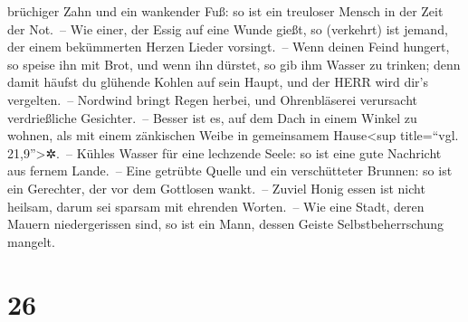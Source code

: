 brüchiger Zahn und ein wankender Fuß: so ist ein treuloser Mensch in der
Zeit der Not.~-- Wie einer, der Essig auf eine Wunde
gießt, so (verkehrt) ist jemand, der einem bekümmerten Herzen Lieder
vorsingt.~-- Wenn deinen Feind hungert, so speise ihn mit
Brot, und wenn ihn dürstet, so gib ihm Wasser zu trinken;
denn damit häufst du glühende Kohlen auf sein Haupt, und
der HERR wird dir's vergelten.~-- Nordwind bringt Regen
herbei, und Ohrenbläserei verursacht verdrießliche Gesichter.~--
Besser ist es, auf dem Dach in einem Winkel zu wohnen,
als mit einem zänkischen Weibe in gemeinsamem Hause\textless sup
title=``vgl. 21,9''\textgreater✲.~-- Kühles Wasser für
eine lechzende Seele: so ist eine gute Nachricht aus fernem Lande.~--
Eine getrübte Quelle und ein verschütteter Brunnen: so
ist ein Gerechter, der vor dem Gottlosen wankt.~-- Zuviel
Honig essen ist nicht heilsam, darum sei sparsam mit ehrenden Worten.~--
Wie eine Stadt, deren Mauern niedergerissen sind, so ist
ein Mann, dessen Geiste Selbstbeherrschung mangelt.

\hypertarget{section-25}{%
\section{26}\label{section-25}}

